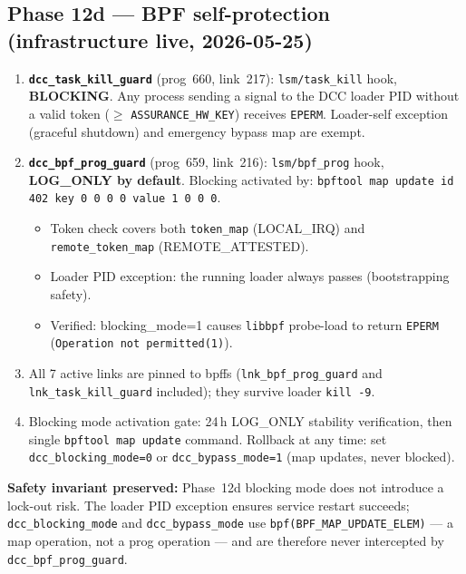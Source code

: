 \documentclass[11pt,a4paper]{article}
\theoremstyle{definition}
\begin{document}
\subsection*{Phase 12d — BPF self-protection (infrastructure live, 2026-05-25)}

\begin{enumerate}[noitemsep]
  \item \textbf{\texttt{dcc\_task\_kill\_guard}} (prog~660, link~217):
        \texttt{lsm/task\_kill} hook, \textbf{BLOCKING}. Any process sending a
        signal to the DCC loader PID without a valid token ($\geq$
        \texttt{ASSURANCE\_HW\_KEY}) receives \texttt{EPERM}.
        Loader-self exception (graceful shutdown) and emergency bypass map
        are exempt.
  \item \textbf{\texttt{dcc\_bpf\_prog\_guard}} (prog~659, link~216):
        \texttt{lsm/bpf\_prog} hook, \textbf{LOG\_ONLY by default}.
        Blocking activated by: \verb|bpftool map update id 402 key 0 0 0 0 value 1 0 0 0|.
        \begin{itemize}[noitemsep]
          \item Token check covers both \texttt{token\_map} (LOCAL\_IRQ) and
                \texttt{remote\_token\_map} (REMOTE\_ATTESTED).
          \item Loader PID exception: the running loader always passes
                (bootstrapping safety).
          \item Verified: blocking\_mode=1 causes \texttt{libbpf} probe-load
                to return \texttt{EPERM} (\texttt{Operation not permitted(1)}).
        \end{itemize}
  \item All 7 active links are pinned to bpffs
        (\texttt{lnk\_bpf\_prog\_guard} and \texttt{lnk\_task\_kill\_guard}
        included); they survive loader \texttt{kill~-9}.
  \item Blocking mode activation gate: 24\,h LOG\_ONLY stability
        verification, then single \texttt{bpftool map update} command.
        Rollback at any time: set \texttt{dcc\_blocking\_mode=0} or
        \texttt{dcc\_bypass\_mode=1} (map updates, never blocked).
\end{enumerate}

\begin{notebox}
\textbf{Safety invariant preserved:} Phase~12d blocking mode does not
introduce a lock-out risk.  The loader PID exception ensures service restart
succeeds; \texttt{dcc\_blocking\_mode} and \texttt{dcc\_bypass\_mode} use
\texttt{bpf(BPF\_MAP\_UPDATE\_ELEM)} — a map operation, not a prog operation
— and are therefore never intercepted by \texttt{dcc\_bpf\_prog\_guard}.
\end{notebox}
\end{document}
